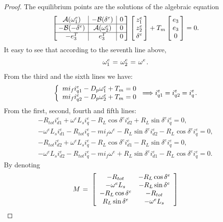 \documentclass[letterpaper, 10 pt, conference]{ieeeconf}
\renewcommand{\o}    {{\omega}}
\newcommand{\m}      {{\hbox{\hskip 1pt}}}
\newcommand{\nm}     {{\hbox{\hskip -3pt}}}
\newcommand{\Amscr}  {{\mathcal{A}}}
\newcommand{\Bmscr}  {{\mathcal{B}}}
\begin{document}
\begin{proof}
The equilibrium points are the solutions of the algebraic equation
\begin{equation} \label{eq:algebricEquation}
   \left[\nm\begin{array}{c|c|c} \Amscr(\o_1^e) & -\Bmscr(\delta^e) &
   0\\ \hline -\Bmscr(-\delta^e) & \Amscr(\o_2^e) & 0\\ \hline -e_3^T 
   & e_3^T & 0\end{array} \nm\right] \left[\nm\begin{array}{c} z_1^e
   \\ z_2^e\\ \delta^e\end{array}\nm\right] + T_m\left[\nm
   \begin{array}{c} e_{3}\\ e_{3}\\ 0 \end{array}\nm\right] = 0.
\end{equation}
It easy to see that according to the seventh line above,
$$\o_1^e \m=\m \o_2^e \m=\m \o^e \m.$$
From the third and the sixth lines we have: 
$$ \left\{ \begin{array}{c} m i_f i_{q1}^e-D_p\o_1^e+T_m=0\\
   mi_f i_{q2}^e-D_p\o_2^e+T_m=0 \end{array}\right.\Longrightarrow
   i_{q1}^{e}=i_{q2}^{e}=i_{q}^{e} \m.$$
From the first, second, fourth and fifth lines:
$$ \begin{array}{c} -R_{tot}i_{d1}^e+\o^e L_s i_q^e-R_L\cos\delta^e
   i_{d2}^e+R_L\sin\delta^e i_q^e=0,\\ -\o^e L_s i_{d1}^e-R_{tot} 
   i_q^e-mi_f\o^e-R_L\sin\delta^e i_{d2}^e-R_L\cos\delta^e i_q^e=0,\\
   -R_{tot}i_{d2}^e+\o^e L_s i_q^e-R_L\cos\delta^e i_{d1}^e-R_L
   \sin\delta^e i_q^e=0,\\ -\o^e L_s i_{d2}^e-R_{tot}i_q^e-mi_f
   \o^e+R_L\sin\delta^e i_{d1}^e-R_L\cos\delta^e i_q^e=0.\end{array}$$
By denoting \vspace{-2mm}
$$ M \m=\m \left[\begin{array}{cc} -R_{tot} & -R_{L}\cos\delta^{e}\\
   -\o^e L_s & -R_L\sin\delta^e\\ -R_L\cos\delta^e & -R_{tot}\\
   R_L\sin\delta^e & -\o^e L_s \end{array}\right]$$

\end{proof}
\end{document}
